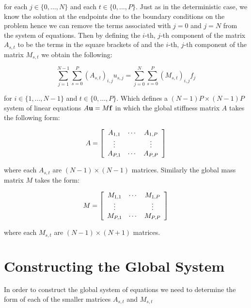 for each $j \in \{0,\ldots,N\}$ and each $t \in \{0,\ldots,P\}$. Just as in
the deterministic case, we know the solution at the endpoints due to the
boundary conditions on the problem  hence we can
remove the terms associated with $j = 0$ and $j = N$ from the system of
equations. Then by defining the $i$-th, $j$-th component of the matrix
$A_{s,t}$ to be the terms in the square brackets of
 and the $i$-th, $j$-th component of the
matrix $M_{s,t}$ we obtain the following:

\begin{equation}
    \sum_{j=1}^{N - 1}\sum_{s=0}^P(A_{s,t})_{i,j}u_{s,j} =
    \sum_{j=0}^N\sum_{s=0}^P(M_{s,t})_{i,j}f_j
\end{equation}

for $i \in \{1,\ldots,N - 1\}$ and $t \in \{0,\ldots,P\}$. Which defines a
$(N - 1)P \times (N - 1)P$ system of linear equations $A\mathbf{u} = M\mathbf{f}$ in
which the global stiffness matrix $A$ takes the following form:

\begin{equation}
    A = \left[\begin{array}{c c c}
            A_{1,1} & \cdots & A_{1,P} \\
            \vdots & & \vdots \\
            A_{P,1} & \cdots & A_{P,P}
        \end{array}\right]
\end{equation}

where each $A_{s,t}$ are $(N - 1) \times (N - 1)$ matrices. Similarly the
global mass matrix $M$ takes the form:

\begin{equation}
    M = \left[\begin{array}{c c c}
            M_{1,1} & \cdots & M_{1,P} \\
            \vdots & & \vdots \\
            M_{P,1} & \cdots & M_{P,P}
        \end{array}\right]
\end{equation}

where each $M_{s,t}$ are $(N - 1) \times (N + 1) $ matrices.

\section{Constructing the Global System}

In order to construct the global system of equations we need to determine the
form of each of the smaller matrices $A_{s,t}$ and $M_{s,t}$

